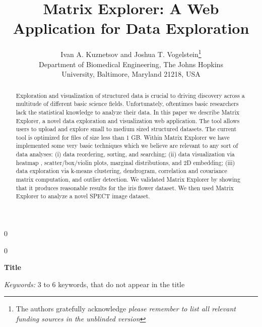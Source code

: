 \documentclass[12pt]{article}
\newcommand{\blind}{0}
\begin{document}
%

\def\spacingset#1{\renewcommand{\baselinestretch}%
{#1}\small\normalsize} \spacingset{1}
\setlength{\parindent}{5ex}



\blind
{
  \title{\bf Matrix Explorer: A Web Application for Data Exploration}
  \author{Ivan A. Kuznetsov and Joshua T. Vogelstein\thanks{
  		The authors gratefully acknowledge \textit{please remember to list all relevant funding sources in the unblinded version}}\hspace{.2cm} \\
    Department of Biomedical Engineering, The Johns Hopkins\\
    University, Baltimore, Maryland 21218, USA}
  \maketitle
} \fi

\blind
{
  \bigskip
  \bigskip
  \bigskip
  \begin{center}
    {\LARGE\bf Title}
\end{center}
  \medskip
} \fi

\bigskip
\begin{abstract}
\noindent Exploration and visualization of structured data is crucial to driving discovery across a multitude of different basic science fields. Unfortunately, oftentimes basic researchers lack the statistical knowledge to analyze their data. In this paper we describe Matrix Explorer, a novel data exploration and visualization web application. The tool allows users to upload and explore small to medium sized structured datasets. The current tool is optimized for files of size less than 1 GB. Within Matrix Explorer we have implemented some very basic techniques which we believe are relevant to any sort of data analyses: (i) data reordering, sorting, and searching; (ii) data visualization via heatmap , scatter/box/violin plots, marginal distributions, and 2D embedding; (iii) data exploration via k-means clustering, dendrogram, correlation and covariance matrix computation, and outlier detection. We validated Matrix Explorer by showing that it produces reasonable results for the iris flower dataset. We then used Matrix Explorer to analyze a novel SPECT image dataset.
\end{abstract}

\noindent%
{\it Keywords:}  3 to 6 keywords, that do not appear in the title
\vfill
\end{document}
